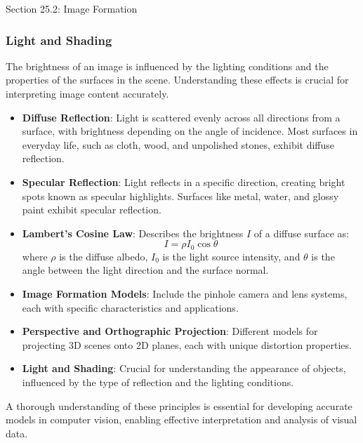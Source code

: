 \begin{notes}{Section 25.2: Image Formation}
\begin{highlight}
    \end{highlight}
    
    \subsubsection*{Light and Shading}
    
    The brightness of an image is influenced by the lighting conditions and the properties of the surfaces in the scene. Understanding these effects is crucial for interpreting image content accurately.
    
    \begin{highlight}
    
        \begin{itemize}
            \item \textbf{Diffuse Reflection}: Light is scattered evenly across all directions from a surface, with brightness depending on the angle of incidence. Most surfaces in everyday life, such as cloth, 
            wood, and unpolished stones, exhibit diffuse reflection.
            \item \textbf{Specular Reflection}: Light reflects in a specific direction, creating bright spots known as specular highlights. Surfaces like metal, water, and glossy paint exhibit specular reflection.
            \item \textbf{Lambert's Cosine Law}: Describes the brightness \( I \) of a diffuse surface as:
            \[
            I = \rho I_0 \cos\theta
            \]
            where \( \rho \) is the diffuse albedo, \( I_0 \) is the light source intensity, and \( \theta \) is the angle between the light direction and the surface normal.
        \end{itemize}
    
    \end{highlight}
    
    \begin{highlight}
    
        \begin{itemize}
            \item \textbf{Image Formation Models}: Include the pinhole camera and lens systems, each with specific characteristics and applications.
            \item \textbf{Perspective and Orthographic Projection}: Different models for projecting 3D scenes onto 2D planes, each with unique distortion properties.
            \item \textbf{Light and Shading}: Crucial for understanding the appearance of objects, influenced by the type of reflection and the lighting conditions.
        \end{itemize}
    
        A thorough understanding of these principles is essential for developing accurate models in computer vision, enabling effective interpretation and analysis of visual data.
    
    \end{highlight}
\end{notes}

